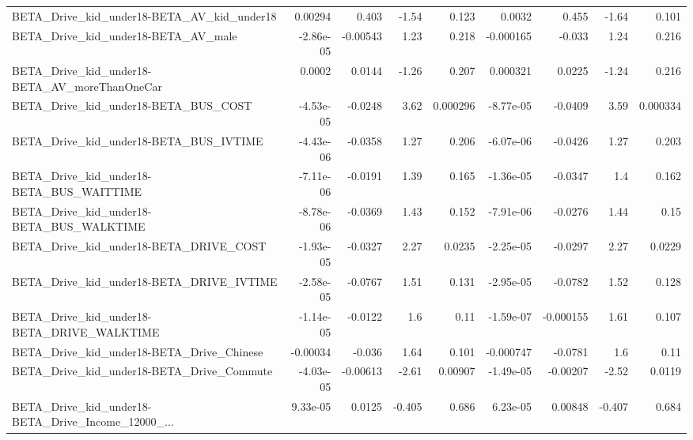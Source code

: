 \begin{tabular}{lrrrrrrrr}
BETA\_Drive\_kid\_under18-BETA\_AV\_kid\_under18         &     0.00294 &        0.403 &     -1.54 &    0.123 &     0.0032 &       0.455 &        -1.64 &         0.101 \\
BETA\_Drive\_kid\_under18-BETA\_AV\_male                &   -2.86e-05 &     -0.00543 &      1.23 &    0.218 &  -0.000165 &      -0.033 &         1.24 &         0.216 \\
BETA\_Drive\_kid\_under18-BETA\_AV\_moreThanOneCar      &      0.0002 &       0.0144 &     -1.26 &    0.207 &   0.000321 &      0.0225 &        -1.24 &         0.216 \\
BETA\_Drive\_kid\_under18-BETA\_BUS\_COST               &   -4.53e-05 &      -0.0248 &      3.62 & 0.000296 &  -8.77e-05 &     -0.0409 &         3.59 &      0.000334 \\
BETA\_Drive\_kid\_under18-BETA\_BUS\_IVTIME             &   -4.43e-06 &      -0.0358 &      1.27 &    0.206 &  -6.07e-06 &     -0.0426 &         1.27 &         0.203 \\
BETA\_Drive\_kid\_under18-BETA\_BUS\_WAITTIME           &   -7.11e-06 &      -0.0191 &      1.39 &    0.165 &  -1.36e-05 &     -0.0347 &          1.4 &         0.162 \\
BETA\_Drive\_kid\_under18-BETA\_BUS\_WALKTIME           &   -8.78e-06 &      -0.0369 &      1.43 &    0.152 &  -7.91e-06 &     -0.0276 &         1.44 &          0.15 \\
BETA\_Drive\_kid\_under18-BETA\_DRIVE\_COST             &   -1.93e-05 &      -0.0327 &      2.27 &   0.0235 &  -2.25e-05 &     -0.0297 &         2.27 &        0.0229 \\
BETA\_Drive\_kid\_under18-BETA\_DRIVE\_IVTIME           &   -2.58e-05 &      -0.0767 &      1.51 &    0.131 &  -2.95e-05 &     -0.0782 &         1.52 &         0.128 \\
BETA\_Drive\_kid\_under18-BETA\_DRIVE\_WALKTIME         &   -1.14e-05 &      -0.0122 &       1.6 &     0.11 &  -1.59e-07 &   -0.000155 &         1.61 &         0.107 \\
BETA\_Drive\_kid\_under18-BETA\_Drive\_Chinese          &    -0.00034 &       -0.036 &      1.64 &    0.101 &  -0.000747 &     -0.0781 &          1.6 &          0.11 \\
BETA\_Drive\_kid\_under18-BETA\_Drive\_Commute          &   -4.03e-05 &     -0.00613 &     -2.61 &  0.00907 &  -1.49e-05 &    -0.00207 &        -2.52 &        0.0119 \\
BETA\_Drive\_kid\_under18-BETA\_Drive\_Income\_12000\_... &    9.33e-05 &       0.0125 &    -0.405 &    0.686 &   6.23e-05 &     0.00848 &       -0.407 &         0.684 \\

\end{tabular}
